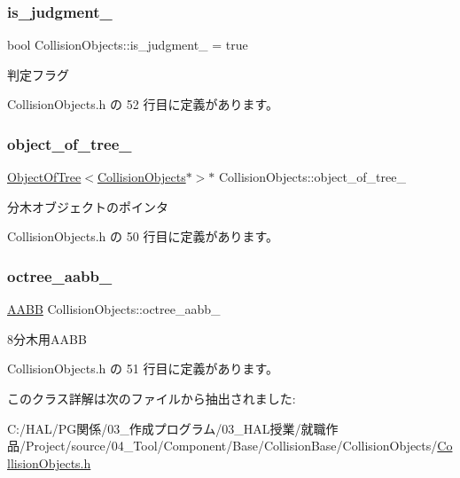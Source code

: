 \subsubsection{\texorpdfstring{is\+\_\+judgment\+\_\+}{is\_judgment\_}}
{\footnotesize\ttfamily bool Collision\+Objects\+::is\+\_\+judgment\+\_\+ = true\hspace{0.3cm}{\ttfamily [private]}}



判定フラグ 



 Collision\+Objects.\+h の 52 行目に定義があります。

\mbox{\label{class_collision_objects_a649c1aa07a6043611aa8f7394690250a}} 
\subsubsection{\texorpdfstring{object\+\_\+of\+\_\+tree\+\_\+}{object\_of\_tree\_}}
{\footnotesize\ttfamily \mbox{\hyperlink{class_object_of_tree}{Object\+Of\+Tree}}$<$\mbox{\hyperlink{class_collision_objects}{Collision\+Objects}}$\ast$$>$$\ast$ Collision\+Objects\+::object\+\_\+of\+\_\+tree\+\_\+\hspace{0.3cm}{\ttfamily [private]}}



分木オブジェクトのポインタ 



 Collision\+Objects.\+h の 50 行目に定義があります。

\mbox{\label{class_collision_objects_a611be393dff69dc143e729c4f3f37399}} 
\subsubsection{\texorpdfstring{octree\+\_\+aabb\+\_\+}{octree\_aabb\_}}
{\footnotesize\ttfamily \mbox{\hyperlink{class_a_a_b_b}{A\+A\+BB}} Collision\+Objects\+::octree\+\_\+aabb\+\_\+\hspace{0.3cm}{\ttfamily [private]}}



8分木用\+A\+A\+BB 



 Collision\+Objects.\+h の 51 行目に定義があります。



このクラス詳解は次のファイルから抽出されました\+:\begin{DoxyCompactItemize}
\item 
C\+:/\+H\+A\+L/\+P\+G関係/03\+\_\+作成プログラム/03\+\_\+\+H\+A\+L授業/就職作品/\+Project/source/04\+\_\+\+Tool/\+Component/\+Base/\+Collision\+Base/\+Collision\+Objects/\mbox{\hyperlink{_collision_objects_8h}{Collision\+Objects.\+h}}\end{DoxyCompactItemize}
